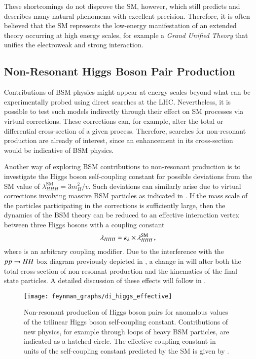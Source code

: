 These shortcomings do not disprove the SM, however, which still predicts and
describes many natural phenomena with excellent precision. Therefore, it is
often believed that the SM represents the low-energy manifestation of an
extended theory occurring at high energy scales, for example a \emph{Grand
  Unified Theory} that unifies the electroweak and strong interaction.


\subsection{Non-Resonant Higgs Boson Pair Production}%
\label{sec:bsm_nonresonant_hh}

Contributions of BSM physics might appear at energy scales beyond what can be
experimentally probed using direct searches at the LHC. Nevertheless, it is
possible to test such models indirectly through their effect on SM processes via
virtual corrections. These corrections can, for example, alter the total or
differential cross-section of a given process. Therefore, searches for
non-resonant \HH production are already of interest, since an enhancement in its
cross-section would be indicative of BSM physics.

Another way of exploring BSM contributions to non-resonant \HH production is to
investigate the Higgs boson self-coupling constant for possible deviations from
the SM value of $\lambda_{HHH}^\text{SM} = 3 m_{H}^2 / v$. Such deviations can
similarly arise due to virtual corrections involving massive BSM particles as
indicated in . If the mass scale of the particles
participating in the corrections is sufficiently large, then the dynamics of the
BSM theory can be reduced to an effective interaction vertex between three Higgs
bosons with a coupling constant
\begin{align*}
  \lambda_{HHH} = \kappa_{\lambda} \times \lambda_{HHH}^{\text{SM}} \,\text{,}
\end{align*}
where \klambda is an arbitrary coupling modifier. Due to the interference with
the $pp \to HH$ box diagram previously depicted in
, a change in \klambda will alter both the total
cross-section of non-resonant \HH production and the kinematics of the final
state particles. A detailed discussion of these effects will follow in
.

\begin{figure}[htbp]
  \centering

  \texttt{[image: feynman\_graphs/di\_higgs\_effective]}

  \caption{Non-resonant production of Higgs boson pairs for anomalous values of
    the trilinear Higgs boson self-coupling constant.  Contributions of new
    physics, for example through loops of heavy BSM particles, are indicated as
    a hatched circle. The effective coupling constant in units of the
    self-coupling constant predicted by the SM is given by \klambda.}%
  \label{fig:bsm_hh_prod_feyn}
\end{figure}

